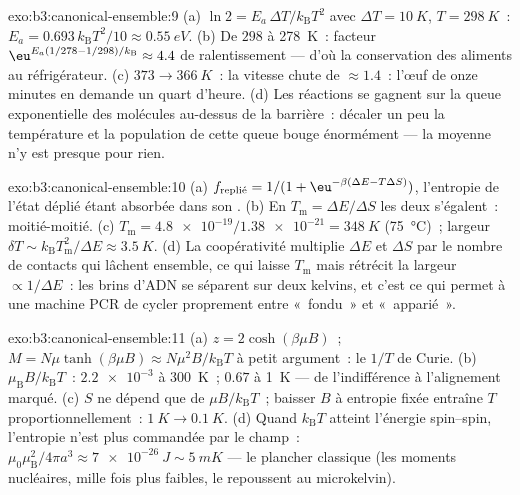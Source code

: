 \begin{solution}{exo:b3:canonical-ensemble:9}
(a) $\ln2 = E_a\,\Delta T/k_{\text{B}}T^2$ avec $\Delta T =
\qty{10}{K}$, $T = \qty{298}{K}$~: $E_a =
0.693\,k_{\text{B}}T^2/10 \approx \qty{0.55}{eV}$. (b) De
$298$ à \qty{278}{K}~: facteur $\eu^{E_a(1/278 - 1/298)/k_{\text{B}}}
\approx 4.4$ de ralentissement --- d'où la conservation des aliments
au réfrigérateur. (c) $373 \to \qty{366}{K}$~: la vitesse chute de
$\approx1.4$~: l'œuf de onze minutes en demande un quart d'heure. (d)
Les réactions se gagnent sur la queue exponentielle des molécules
au-dessus de la barrière~: décaler un peu la température et la
population de cette queue bouge énormément --- la moyenne n'y est
presque pour rien.
\end{solution}

\begin{solution}{exo:b3:canonical-ensemble:10}
(a) $f_{\text{replié}} = 1/(1 + \eu^{-\beta(\Delta E -
T\Delta S)})$, l'entropie de l'état déplié étant absorbée dans son
. (b) En $T_{\text{m}} = \Delta E/\Delta S$ les deux
 s'égalent~: moitié-moitié. (c) $T_{\text{m}} =
\num{4.8e-19}/\num{1.38e-21} = \qty{348}{K}$ (\qty{75}{\celsius})~;
largeur $\delta T \sim k_{\text{B}}T_{\text{m}}^2/\Delta E \approx
\qty{3.5}{K}$. (d) La coopérativité multiplie $\Delta E$ et
$\Delta S$ par le nombre de contacts qui lâchent ensemble, ce qui
laisse $T_{\text{m}}$ mais rétrécit la largeur $\propto 1/\Delta E$~: les
brins d'ADN se séparent sur deux kelvins, et c'est ce qui permet à une
machine PCR de cycler proprement entre «~fondu~» et «~apparié~».
\end{solution}

\begin{solution}{exo:b3:canonical-ensemble:11}
(a) $z = 2\cosh(\beta\mu B)$~; $M = N\mu\tanh(\beta\mu B) \approx
N\mu^2B/k_{\text{B}}T$ à petit argument~: le $1/T$ de Curie. (b)
$\mu_{\text{B}}B/k_{\text{B}}T$~: $\num{2.2e-3}$ à \qty{300}{K}~;
$0.67$ à \qty{1}{K} --- de l'indifférence à l'alignement marqué. (c)
$S$ ne dépend que de $\mu B/k_{\text{B}}T$~; baisser $B$ à entropie
fixée entraîne $T$ proportionnellement~: $\qty{1}{K} \to
\qty{0.1}{K}$. (d) Quand $k_{\text{B}}T$ atteint l'énergie
spin--spin, l'entropie n'est plus commandée par le champ~:
$\mu_0\mu_{\text{B}}^2/4\pi a^3 \approx \qty{7e-26}{J} \sim
\qty{5}{mK}$ --- le plancher classique (les moments nucléaires, mille
fois plus faibles, le repoussent au microkelvin).
\end{solution}


